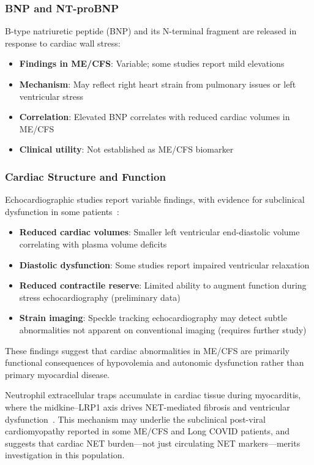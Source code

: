 \subsubsection{BNP and NT-proBNP}

B-type natriuretic peptide (BNP) and its N-terminal fragment are released in response to cardiac wall stress:

\begin{itemize}
    \item \textbf{Findings in ME/CFS}: Variable; some studies report mild elevations~\cite{Tomas2017}
    \item \textbf{Mechanism}: May reflect right heart strain from pulmonary issues or left ventricular stress
    \item \textbf{Correlation}: Elevated BNP correlates with reduced cardiac volumes in ME/CFS~\cite{Tomas2017}
    \item \textbf{Clinical utility}: Not established as ME/CFS biomarker
\end{itemize}

\subsubsection{Cardiac Structure and Function}

Echocardiographic studies report variable findings, with evidence for subclinical dysfunction in some patients~\cite{Newton2016}:

\begin{itemize}
    \item \textbf{Reduced cardiac volumes}: Smaller left ventricular end-diastolic volume correlating with plasma volume deficits~\cite{Newton2016}
    \item \textbf{Diastolic dysfunction}: Some studies report impaired ventricular relaxation
    \item \textbf{Reduced contractile reserve}: Limited ability to augment function during stress echocardiography (preliminary data)
    \item \textbf{Strain imaging}: Speckle tracking echocardiography may detect subtle abnormalities not apparent on conventional imaging (requires further study)
\end{itemize}

These findings suggest that cardiac abnormalities in ME/CFS are primarily functional consequences of hypovolemia and autonomic dysfunction rather than primary myocardial disease.

Neutrophil extracellular traps accumulate in cardiac tissue during myocarditis, where the midkine--LRP1 axis drives NET-mediated fibrosis and ventricular dysfunction~\cite{Weckbach2019}. This mechanism may underlie the subclinical post-viral cardiomyopathy reported in some ME/CFS and Long COVID patients, and suggests that cardiac NET burden---not just circulating NET markers---merits investigation in this population.

